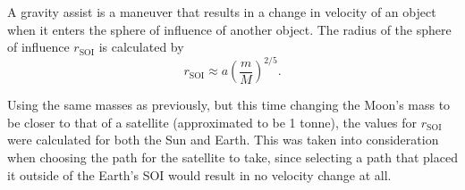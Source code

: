 \documentclass[12pt, english]{report}
\begin{document}
\normalsize{\noindent A gravity assist is a maneuver that results in a change in velocity of an object when it enters the sphere of influence of another object. The radius of the sphere of influence $r_{\mathrm{SOI}}$ is calculated by
\begin{equation}
    r_{\mathrm{SOI}} \approx a\left( \frac{m}{M} \right)^{2/5}.
\end{equation}

Using the same masses as previously, but this time changing the Moon's mass to be closer to that of a satellite (approximated to be 1 tonne), the values for $r_{\mathrm{SOI}}$ were calculated for both the Sun and Earth. This was taken into consideration when choosing the path for the satellite to take, since selecting a path that placed it outside of the Earth's SOI would result in no velocity change at all. 

}
\end{document}
